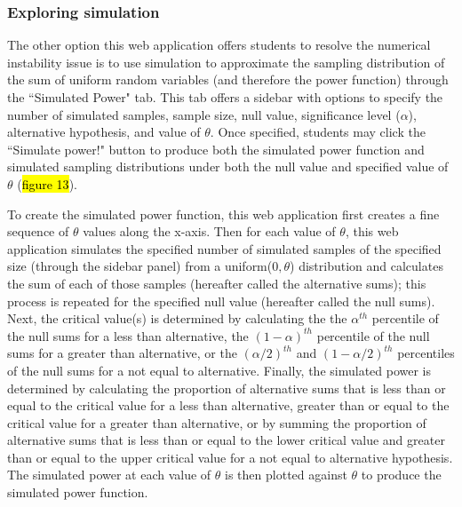 \documentclass{TISE}
\begin{document}
\subsubsection{Exploring simulation}

The other option this web application offers students to resolve the numerical instability issue is to use simulation to approximate the sampling distribution of the sum of uniform random variables (and therefore the power function) through the ``Simulated Power" tab. This tab offers a sidebar with options to specify the number of simulated samples, sample size, null value, significance level ($\alpha$), alternative hypothesis, and value of $\theta$. Once specified, students may click the ``Simulate power!" button to produce both the simulated power function and simulated sampling distributions under both the null value and specified value of $\theta$ (\hl{figure 13}).

To create the simulated power function, this web application first  creates a fine sequence of $\theta$ values along the x-axis. Then for each value of $\theta$, this web application simulates the specified number of simulated samples of the specified size (through the sidebar panel) from a uniform($0, \theta$) distribution and calculates the sum of each of those samples (hereafter called the alternative sums); this process is repeated for the specified null value (hereafter called the null sums). Next, the critical value(s) is determined by calculating the the $\alpha^{th}$ percentile of the null sums for a less than alternative, the $(1 - \alpha)^{th}$ percentile of the null sums for a greater than alternative, or the $(\alpha/2)^{th}$ and $(1 - \alpha/2)^{th}$ percentiles of the null sums for a not equal to alternative. Finally, the simulated power is determined by calculating the proportion of alternative sums that is less than or equal to the critical value for a less than alternative, greater than or equal to the critical value for a greater than alternative, or by summing the proportion of alternative sums that is less than or equal to the lower critical value and greater than or equal to the upper critical value for a not equal to alternative hypothesis. The simulated power at each value of $\theta$ is then plotted against $\theta$ to produce the simulated power function. 
\end{document}
